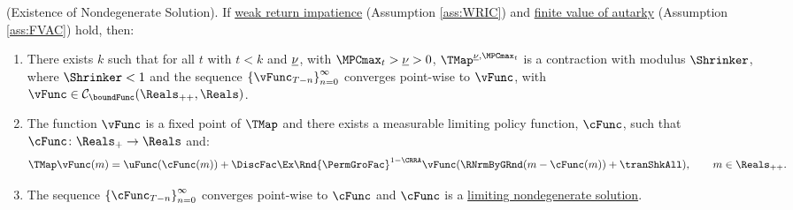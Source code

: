 \documentclass[BufferStockTheory]{subfiles}
\begin{document}
\hypertarget{Sufficient-Conditions-For-Nondegenerate-Solution}{}
\begin{theorem}(Existence of Nondegenerate Solution).
\label{thm:convgtobellman}
If \hyperlink{WRIC}{weak return impatience} (Assumption \ref{ass:WRIC}) and \hyperlink{FVAC}{finite value of autarky} (Assumption \ref{ass:FVAC}) hold, then:
%
\begin{enumerate}[label=(\roman*)]
\item There exists $k$ such that for all $t$ with $t<k$ and $\underline{\nu}$, with $\MPCmax_{t}>\MPCminInf>0$, $\TMap^{\MPCminInf, \MPCmax_{t}}$ is a contraction with modulus $\Shrinker$, where $\Shrinker<1$ and the sequence $\left\{\vFunc_{T-n}\right\}_{n=0}^{\infty}$ converges point-wise to $\vFunc$, with $\vFunc \in \mathcal{C}_{\boundFunc}(\Reals_{++},\Reals)$.
\item The function $\vFunc$ is a fixed point of $\TMap$ and there exists a measurable limiting policy function, $\cFunc$, such that $\cFunc\colon \Reals_{+}\rightarrow \Reals$ and:
\begin{equation}\label{eq:stationarybellman}
\TMap\vFunc(m) =  \uFunc(\cFunc(m)) + \DiscFac\Ex \Rnd{\PermGroFac}^{1-\CRRA}\vFunc(\RNrmByGRnd(m-\cFunc(m)) + \tranShkAll) , \qquad m\in \Reals_{++}. 
\end{equation}
\item  The sequence $\left\{\cFunc_{T-n}\right\}_{n=0}^{\infty}$ converges point-wise to $\cFunc$ and $\cFunc$  is a \hyperlink{Definition-of-a-Nondegenerate-Solution}{limiting nondegenerate solution}.
\end{enumerate}
\end{theorem}
\end{document}
